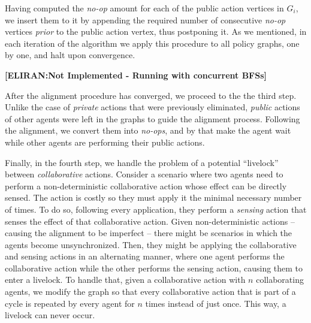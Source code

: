 \documentclass[letterpaper]{article} %
\newcommand{\eliran}[1]{\textbf{[\color{red}ELIRAN:#1]}}
\begin{document}
Having computed the  {\em no-op} amount for each of the public action vertices in $G_i$, we insert them to it by appending the required number of consecutive {\em no-op} vertices \emph{prior} to the public action vertex, thus postponing it.
As we mentioned, in each iteration of the algorithm we apply this procedure to all policy graphs, one by one, and halt upon convergence.

\eliran{Not Implemented - Running with concurrent BFSs}

After the alignment procedure has converged, we proceed to the the third step. Unlike the case of \emph{private} actions that were previously eliminated, \emph{public} actions of other agents were left in the graphs to guide the alignment process. Following the alignment, we convert them into \emph{no-ops}, and by that make the agent wait while other agents are performing their public actions.

Finally, in the fourth step, we handle the problem of a potential ``livelock''
between \emph{collaborative} actions. Consider a scenario where two agents need to perform a non-deterministic collaborative action whose effect can be directly sensed. The action is costly so they must apply it the minimal necessary number of times. To do so, following every application, they perform a \emph{sensing} action that senses the effect of that collaborative action.
Given non-deterministic actions -- causing the alignment to be imperfect -- there might be scenarios in which the agents become unsynchronized. Then, they might be applying the collaborative and sensing actions in an alternating manner, where one agent performs the collaborative action while the other performs the sensing action, causing them to enter a livelock. To handle that, given a collaborative action with $n$ collaborating agents, we modify the graph so that every collaborative action that is part of a cycle is repeated by every agent for $n$ times instead of just once. This way, a livelock can never occur.
\end{document}
